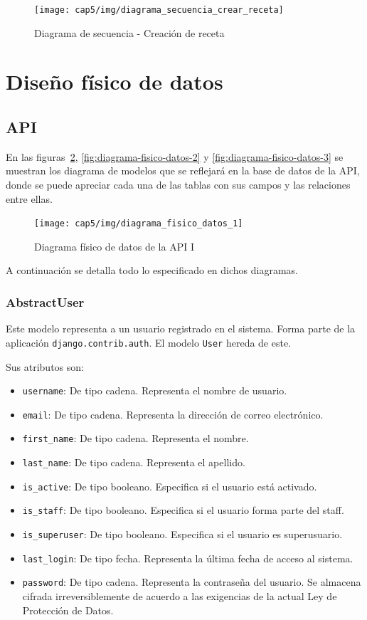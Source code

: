 \begin{figure}[htbp]
  \centering
  \texttt{[image: cap5/img/diagrama\_secuencia\_crear\_receta]}
  \caption{Diagrama de secuencia - Creación de receta}
  \label{fig:diagrama-secuencia-crear-receta}
\end{figure}


\section{Diseño físico de datos}

\subsection{API}

En las figuras~\ref{fig:diagrama-fisico-datos-1},
\ref{fig:diagrama-fisico-datos-2} y \ref{fig:diagrama-fisico-datos-3} se
muestran los diagrama de modelos que se reflejará en la base de datos de la API,
donde se puede apreciar cada una de las tablas con sus campos y las relaciones
entre ellas.


\begin{figure}[htbp]
  \centering
  \texttt{[image: cap5/img/diagrama\_fisico\_datos\_1]}
  \caption{Diagrama físico de datos de la API I}
  \label{fig:diagrama-fisico-datos-1}
\end{figure}


A continuación se detalla todo lo especificado en dichos diagramas.

\subsubsection{AbstractUser}

Este modelo representa a un usuario registrado en el sistema. Forma parte de la
aplicación \texttt{django.contrib.auth}. El modelo \texttt{User} hereda de este.

Sus atributos son:
\begin{itemize}
\item \texttt{username}: De tipo cadena. Representa el nombre de usuario.
\item \texttt{email}: De tipo cadena. Representa la dirección de correo
  electrónico.
\item \texttt{first\_name}: De tipo cadena. Representa el nombre.
\item \texttt{last\_name}: De tipo cadena. Representa el apellido.
\item \texttt{is\_active}: De tipo booleano. Especifica si el usuario está
  activado.
\item \texttt{is\_staff}: De tipo booleano. Especifica si el usuario forma parte
  del staff.
\item \texttt{is\_superuser}: De tipo booleano. Especifica si el usuario es
  superusuario.
\item \texttt{last\_login}: De tipo fecha. Representa la última fecha de acceso
  al sistema.
\item \texttt{password}: De tipo cadena. Representa la contraseña del usuario.
  Se almacena cifrada irreversiblemente de acuerdo a las exigencias de la actual
  Ley de Protección de Datos.
\end{itemize}


